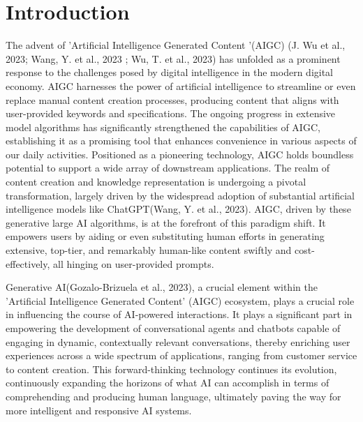 \documentclass[fleqn,10pt]{thescipub} %
\affiliation{\textsuperscript{1}\textit{Department of Computer Engineeering, K J Somaiya Institute of Technology, Mumbai, India;}} %
\begin{document}
\flushbottom %

\maketitle %


\section*{Introduction} The advent of 'Artificial Intelligence Generated Content '(AIGC) (J. Wu et al., 2023; Wang, Y. et al., 2023 ; Wu, T. et al., 2023) has unfolded as a prominent response to the challenges posed by digital intelligence in the modern digital economy. AIGC harnesses the power of artificial intelligence to streamline or even replace manual content creation processes, producing content that aligns with user-provided keywords and specifications. The ongoing progress in extensive model algorithms has significantly strengthened the capabilities of AIGC, establishing it as a promising tool that enhances convenience in various aspects of our daily activities. Positioned as a pioneering technology, AIGC holds boundless potential to support a wide array of downstream applications. The realm of content creation and knowledge representation is undergoing a pivotal transformation, largely driven by the widespread adoption of substantial artificial intelligence models like ChatGPT(Wang, Y. et al., 2023).  AIGC, driven by these generative large AI algorithms, is at the forefront of this paradigm shift. It empowers users by aiding or even substituting human efforts in generating extensive, top-tier, and remarkably human-like content swiftly and cost-effectively, all hinging on user-provided prompts. 

\baselineskip

Generative AI(Gozalo-Brizuela et al., 2023), a crucial element within the 'Artificial Intelligence Generated Content' (AIGC) ecosystem, plays a crucial role in influencing the course of AI-powered interactions. It plays a significant part in empowering the development of conversational agents and chatbots capable of engaging in dynamic, contextually relevant conversations, thereby enriching user experiences across a wide spectrum of applications, ranging from customer service to content creation. This forward-thinking technology continues its evolution, continuously expanding the horizons of what AI can accomplish in terms of comprehending and producing human language, ultimately paving the way for more intelligent and responsive AI systems.
\end{document}
